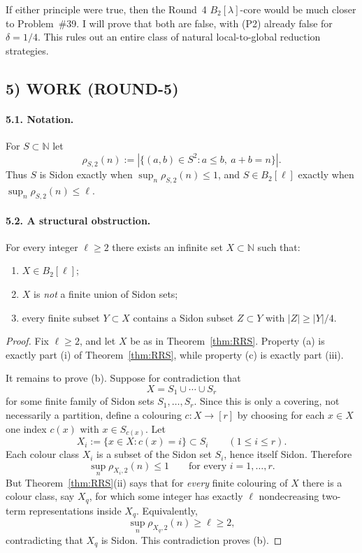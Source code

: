 If either principle were true, then the Round~4 $B_2[\lambda]$-core would be much closer to
Problem~\#39. I will prove that both are false, with (P2) already false for $\delta=1/4$.
This rules out an entire class of natural local-to-global reduction strategies.

\subsection*{5) WORK (ROUND-5)}
\paragraph{5.1. Notation.}
For $S\subset\mathbb N$ let
\[
\rho_{S,2}(n):=|\{(a,b)\in S^2:a\le b,\ a+b=n\}|.
\]
Thus $S$ is Sidon exactly when $\sup_n \rho_{S,2}(n)\le 1$, and $S\in B_2[\ell]$ exactly when
$\sup_n \rho_{S,2}(n)\le \ell$.

\paragraph{5.2. A structural obstruction.}
\begin{proposition}\label{prop:mainobstruction}
For every integer $\ell\ge 2$ there exists an infinite set $X\subset\mathbb N$ such that:
\begin{enumerate}
\item[(a)] $X\in B_2[\ell]$;
\item[(b)] $X$ is \emph{not} a finite union of Sidon sets;
\item[(c)] every finite subset $Y\subset X$ contains a Sidon subset $Z\subset Y$ with
$|Z|\ge |Y|/4$.
\end{enumerate}
\end{proposition}

\begin{proof}
Fix $\ell\ge 2$, and let $X$ be as in Theorem~\ref{thm:RRS}.
Property (a) is exactly part (i) of Theorem~\ref{thm:RRS}, while property (c) is exactly part (iii).

It remains to prove (b). Suppose for contradiction that
\[
X=S_1\cup\cdots\cup S_r
\]
for some finite family of Sidon sets $S_1,\dots,S_r$.
Since this is only a covering, not necessarily a partition, define a colouring
$c:X\to [r]$ by choosing for each $x\in X$ one index $c(x)$ with $x\in S_{c(x)}$.
Let
\[
X_i:=\{x\in X:c(x)=i\}\subset S_i
\qquad (1\le i\le r).
\]
Each colour class $X_i$ is a subset of the Sidon set $S_i$, hence itself Sidon. Therefore
\[
\sup_n \rho_{X_i,2}(n)\le 1
\qquad\text{for every }i=1,\dots,r.
\]
But Theorem~\ref{thm:RRS}(ii) says that for \emph{every} finite colouring of $X$ there is a colour
class, say $X_q$, for which some integer has exactly $\ell$ nondecreasing two-term
representations inside $X_q$. Equivalently,
\[
\sup_n \rho_{X_q,2}(n)\ge \ell\ge 2,
\]
contradicting that $X_q$ is Sidon.
This contradiction proves (b).
\end{proof}

